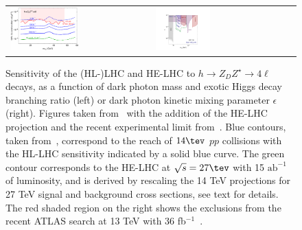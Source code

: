 \begin{figure}
\begin{tabular}{m{} m{}}
\includegraphics[width=0.5\textwidth]{section9/plots/zzdbrplot}
&
\includegraphics[width=0.4\textwidth]{section9/plots/new_zzdplot_epsilon}
\end{tabular}
\caption{
Sensitivity of the (HL-)LHC and HE-LHC to  $h \to Z_D Z^{\star} \to 4 \ell$ decays, as a function of dark photon mass and exotic Higgs decay branching ratio (left) or dark photon kinetic mixing parameter $\epsilon$ (right). Figures taken from~\cite{Curtin:2014cca} with the addition of the HE-LHC projection and the recent experimental limit from~\cite{Aaboud:2018fvk}.
%
 Blue contours, taken from~\cite{Curtin:2014cca}, correspond to the reach of $14 \tev$ $pp$ collisions with the HL-LHC sensitivity indicated by a solid blue curve. The green contour corresponds to the HE-LHC at $\sqrt{s} = 27 \tev$ with 15 $\mathrm{ab}^{-1}$ of luminosity, and is derived by rescaling the 14 TeV projections for 27 TeV signal and background cross sections, see text for details. The red shaded region on the right shows the exclusions from the recent ATLAS search at 13 TeV with 36 fb$^{-1}$~\cite{Aaboud:2018fvk}.
}
\label{f.darkphotonZZD}
\end{figure}



